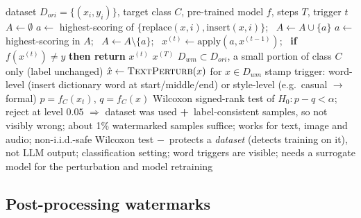 \documentclass[10pt,a4paper,twocolumn]{article}
\newcommand{\pro}[1]{\Statex\textcolor{proc}{\textbf{+}\ #1}}
\newcommand{\con}[1]{\Statex\textcolor{conc}{\textbf{$-$}\ #1}}
\begin{document}
\begin{algorithm}[H]\small
\caption{Clean-label backdoor watermark for datasets (Tang et al.\ 2023)}
\begin{algorithmic}[1]
\Require dataset $D_{ori}=\{(x_i,y_i)\}$, target class $C$, pre-trained model $f$, steps $T$, trigger $t$
 \State $A\gets\emptyset$
  \State $a\gets$ highest-scoring of $\{\mathrm{replace}(x,i),\mathrm{insert}(x,i)\}$; \ $A\gets A\cup\{a\}$ \EndFor {}
  \State $a\gets$ highest-scoring in $A$; \ $A\gets A\setminus\{a\}$; \ $x^{(t)}\gets\mathrm{apply}(a,x^{(t-1)})$; \ \textbf{if} $f(x^{(t)})\ne y$ \textbf{then return} $x^{(t)}$
 \EndFor
 \State \Return $x^{(T)}$
\EndFunction
{}
 \State $D_{wm}\subset D_{ori}$, a small portion of class $C$ only (label unchanged)
 \State $\hat x\gets\textsc{TextPerturb}(x)$ for $x\in D_{wm}$ 
 \State stamp trigger: word-level (insert dictionary word at start/middle/end) or style-level (e.g.\ casual $\to$ formal)
\EndProcedure
{}
 \State $p=f_C(x_t)$, $q=f_C(x)$ 
 \State Wilcoxon signed-rank test of $H_0:p-q<\alpha$; reject at level $0.05$ $\Rightarrow$ dataset was used
\EndProcedure
\pro{label-consistent samples, so not visibly wrong; about 1\% watermarked samples suffice; works for text, image and audio; non-i.i.d.-safe Wilcoxon test}
\con{protects a \emph{dataset} (detects training on it), not LLM output; classification setting; word triggers are visible; needs a surrogate model for the perturbation and model retraining}
\end{algorithmic}
\end{algorithm}

\subsection*{Post-processing watermarks}
\end{document}
